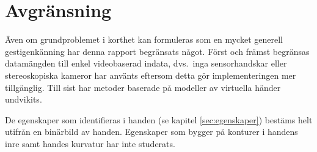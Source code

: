 \documentclass[../rapport_MVEX01-11-05]{subfiles}
\begin{document}
\section{Avgränsning}

Även om grundproblemet i korthet kan formuleras som en mycket generell
gestigenkänning har denna rapport begränsats något. Först och främst
begränsas datamängden till enkel videobaserad indata, dvs.~inga sensorhandskar
eller stereoskopiska kameror har använts eftersom detta gör implementeringen mer
tillgänglig. Till sist har metoder baserade på modeller av virtuella händer
undvikits.

De egenskaper som identifieras i handen (se kapitel
\ref{sec:egenskaper}) bestäms helt utifrån en binärbild av
handen. Egenskaper som bygger på konturer i handens inre samt handes
kurvatur har inte studerats.
\end{document}
